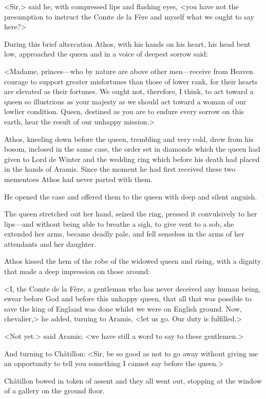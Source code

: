 <Sir,> said he, with compressed lips and flashing eyes, <you have not the presumption to instruct the Comte de la Fère and myself what we ought to say here?>

During this brief altercation Athos, with his hands on his heart, his head bent low, approached the queen and in a voice of deepest sorrow said:

<Madame, princes—who by nature are above other men—receive from Heaven courage to support greater misfortunes than those of lower rank, for their hearts are elevated as their fortunes. We ought not, therefore, I think, to act toward a queen so illustrious as your majesty as we should act toward a woman of our lowlier condition. Queen, destined as you are to endure every sorrow on this earth, hear the result of our unhappy mission.>

Athos, kneeling down before the queen, trembling and very cold, drew from his bosom, inclosed in the same case, the order set in diamonds which the queen had given to Lord de Winter and the wedding ring which   before his death had placed in the hands of Aramis. Since the moment he had first received these two mementoes Athos had never parted with them.

He opened the case and offered them to the queen with deep and silent anguish.

The queen stretched out her hand, seized the ring, pressed it convulsively to her lips—and without being able to breathe a sigh, to give vent to a sob, she extended her arms, became deadly pale, and fell senseless in the arms of her attendants and her daughter.

Athos kissed the hem of the robe of the widowed queen and rising, with a dignity that made a deep impression on those around:

<I, the Comte de la Fère, a gentleman who has never deceived any human being, swear before God and before this unhappy queen, that all that was possible to save the king of England was done whilst we were on English ground. Now, chevalier,> he added, turning to Aramis, <let us go. Our duty is fulfilled.>

<Not yet.> said Aramis; <we have still a word to say to these gentlemen.>

And turning to Châtillon: <Sir, be so good as not to go away without giving me an opportunity to tell you something I cannot say before the queen.>

Châtillon bowed in token of assent and they all went out, stopping at the window of a gallery on the ground floor.

